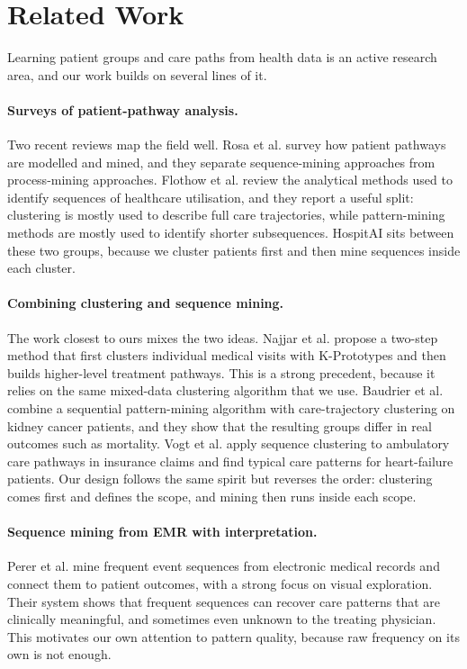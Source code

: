 
\section{Related Work}
\label{sec:related}

Learning patient groups and care paths from health data is an active research area, and our work builds on several lines of it.

\paragraph{Surveys of patient-pathway analysis.}
Two recent reviews map the field well. Rosa et al. \cite{rosa2022modelling} survey how patient pathways are modelled and mined, and they separate sequence-mining approaches from process-mining approaches. Flothow et al. \cite{flothow2023} review the analytical methods used to identify sequences of healthcare utilisation, and they report a useful split: clustering is mostly used to describe full care trajectories, while pattern-mining methods are mostly used to identify shorter subsequences. HospitAI sits between these two groups, because we cluster patients first and then mine sequences inside each cluster.

\paragraph{Combining clustering and sequence mining.}
The work closest to ours mixes the two ideas. Najjar et al. \cite{najjar2018twostep} propose a two-step method that first clusters individual medical visits with K-Prototypes and then builds higher-level treatment pathways. This is a strong precedent, because it relies on the same mixed-data clustering algorithm that we use. Baudrier et al. \cite{baudrier2022} combine a sequential pattern-mining algorithm with care-trajectory clustering on kidney cancer patients, and they show that the resulting groups differ in real outcomes such as mortality. Vogt et al. \cite{vogt2017} apply sequence clustering to ambulatory care pathways in insurance claims and find typical care patterns for heart-failure patients. Our design follows the same spirit but reverses the order: clustering comes first and defines the scope, and mining then runs inside each scope.

\paragraph{Sequence mining from EMR with interpretation.}
Perer et al. \cite{perer2015mining} mine frequent event sequences from electronic medical records and connect them to patient outcomes, with a strong focus on visual exploration. Their system shows that frequent sequences can recover care patterns that are clinically meaningful, and sometimes even unknown to the treating physician. This motivates our own attention to pattern quality, because raw frequency on its own is not enough.

